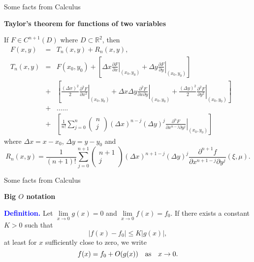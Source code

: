 \documentclass{beamer}
\begin{document}


\begin{frame}{\small Some facts from Calculus}

{\footnotesize

\textbf{Taylor's theorem for functions of two variables}

\vskip 3mm
If $F\in C^{n+1}(D)$ where $D\subset\mathbb{R}^2$,
then
\begin{eqnarray}
F(x, y) &=& T_{n}(x, y)+R_{n}(x, y), \nonumber \\
T_{n}(x, y) &=& F(x_{0}, y_{0})+
\left[\Delta x\left.\frac{\partial F}{\partial x}\right\vert_{(x_{0}, y_{0})}+
\Delta y\left.\frac{\partial F}{\partial y}\right\vert_{(x_{0}, y_{0})}\right] \nonumber \\
&+& \left[\frac{(\Delta x)^{2}}{2}\left.\frac{\partial^2 F}{\partial x^2}\right\vert_{(x_{0}, y_{0})}+
\Delta x \Delta y\left.\frac{\partial^2 F}{\partial x\partial y}\right\vert_{(x_{0}, y_{0})}+
\frac{(\Delta y)^{2}}{2}\left.\frac{\partial^2 F}{\partial y^2}\right\vert_{(x_{0}, y_{0})}
\right] \qquad \nonumber \\
&+& \dots\dots \nonumber \\
&+& \left[\frac{1}{n!}\sum_{j=0}^{n}
\left(
\begin{array}{c}
n \\
 j
\end{array}
\right)
(\Delta x)^{n-j}(\Delta y)^{j}
\left.\frac{\partial^{n} F}{\partial x^{n-j}\partial y^{j}}\right\vert_{(x_{0}, y_{0})}\right] \nonumber
\end{eqnarray}
where $\Delta x=x-x_{0}$, $\Delta y=y-y_{0}$ and
\[
R_{n}(x, y)=
\frac{1}{(n+1)!}\sum_{j=0}^{n+1}
\left(
\begin{array}{c}
n+1 \\
 j
\end{array}
\right)
(\Delta x)^{n+1-j}(\Delta y)^{j}
\frac{\partial^{n+1} f}{\partial x^{n+1-j}\partial y^{j}}(\xi, \mu) .
\]
}



\end{frame}



\begin{frame}{\small Some facts from Calculus}



\textbf{Big $O$ notation}

\vskip 5mm
\textcolor{blue}{\textbf{Definition.}} Let $\lim\limits_{x\to 0}g(x)=0$ and
$\lim\limits_{x\to 0}f(x)=f_{0}$. If there exists
a constant $K>0$ such that
\[
\vert f(x)-f_{0}\vert   \leq K \vert g(x)\vert,
\]
at least for $x$ sufficiently close to zero, we write
\[
f(x)=f_{0}+O(g(x)) \quad {\rm as} \quad x\to 0.
\]


\end{frame}
\end{document}

